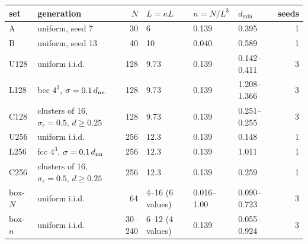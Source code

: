 \begin{tabular}{llrlllr}
\toprule
set & generation & $N$ & $L=\kappa L$ & $n=N/L^3$ & $d_{\min}$ & seeds \\
\midrule
A & uniform, seed 7 & 30 & 6 & 0.139 & 0.395 & 1 \\
B & uniform, seed 13 & 40 & 10 & 0.040 & 0.589 & 1 \\
U128 & uniform i.i.d. & 128 & 9.73 & 0.139 & 0.142--0.411 & 3 \\
L128 & bcc $4^3$, $\sigma=0.1\,d_{\rm nn}$ & 128 & 9.73 & 0.139 & 1.208--1.366 & 3 \\
C128 & clusters of 16, $\sigma_c=0.5$, $d\ge0.25$ & 128 & 9.73 & 0.139 & 0.251--0.255 & 3 \\
U256 & uniform i.i.d. & 256 & 12.3 & 0.139 & 0.148 & 1 \\
L256 & fcc $4^3$, $\sigma=0.1\,d_{\rm nn}$ & 256 & 12.3 & 0.139 & 1.011 & 1 \\
C256 & clusters of 16, $\sigma_c=0.5$, $d\ge0.25$ & 256 & 12.3 & 0.139 & 0.259 & 1 \\
box-$N$ & uniform i.i.d. & 64 & 4--16 (6 values) & 0.016--1.00 & 0.090--0.723 & 3 \\
box-$n$ & uniform i.i.d. & 30--240 & 6--12 (4 values) & 0.139 & 0.055--0.924 & 3 \\
\bottomrule
\end{tabular}
